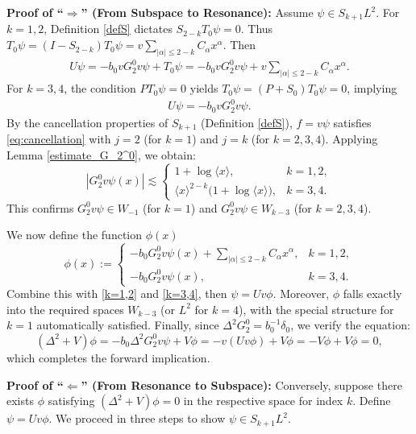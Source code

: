 \documentclass[reqno]{amsart}
\numberwithin{equation}{section}
\begin{document}
\textbf{Proof of ``$\bm{\Longrightarrow}$'' (From Subspace to Resonance):} 
Assume $\psi \in S_{{k}+1}L^2$. 
For ${k}=1,2$, Definition \ref{defS} dictates $S_{2-{k}}T_0\psi = 0$. Thus $T_0\psi = (I - S_{2-{k}})T_0\psi = v \sum_{|\alpha| \le 2-{k}} C_{\alpha} x^\alpha$. Then
\begin{align}\label{k=1,2}
	U\psi = -b_0 v G_2^0 v\psi + T_0\psi = -b_0 v G_2^0 v\psi + v\sum_{|\alpha| \le 2-{k}} C_{\alpha }x^\alpha.
\end{align}
For ${k}=3,4$, the condition $PT_0\psi = 0$ yields $T_0\psi =(P+S_0) T_0\psi=0$, implying
\begin{align}\label{k=3,4}
	U\psi = -b_0 v G_2^0 v\psi.
\end{align}
By the cancellation properties of $S_{{k}+1}$ (Definition \ref{defS}), $f = v\psi$ satisfies \eqref{eq:cancellation} with $j=2$ (for ${k}=1$) and $j={k}$ (for ${k}=2,3,4$). Applying Lemma \ref{estimate_G_2^0}, we obtain:
\begin{equation}\label{estimate_phi_G}
	\left| G_2^0 v\psi(x) \right| \lesssim
	\begin{cases}
		1 + \log \langle x \rangle, & {k} = 1,2, \\
		\langle x \rangle^{2 - {k}} \big( 1 + \log \langle x \rangle \big), & {k} = 3,4.
	\end{cases}
\end{equation}
This confirms $G_2^0 v\psi \in W_{-1}$ (for ${k}=1$) and $G_2^0 v\psi \in W_{{k}-3}$ (for ${k}=2,3,4$).

We now define the function $\phi(x)$ 
\begin{equation}\label{expression_psi}
	\phi(x) :=
	\begin{cases}
		-b_0 G_2^0 v\psi(x) + \sum_{|\alpha| \le 2 - {k}} C_\alpha x^\alpha, & {k} = 1,2, \\
		-b_0 G_2^0 v\psi(x), & {k} = 3,4.
	\end{cases}
\end{equation}
Combine this with  \eqref{k=1,2} and \eqref{k=3,4},  then $\psi = Uv\phi$. Moreover, $\phi$ falls exactly into the required spaces $W_{{k}-3}$ (or $L^2$ for ${k}=4$), with the special structure for ${k}=1$ automatically satisfied. Finally, since $\Delta^2 G_2^0 = b_0^{-1} \delta_0$, we verify the equation:
\[
(\Delta^2 + V)\phi = -b_0 \Delta^2 G_2^0 v\psi + V\phi = -v( Uv\phi) + V\phi = -V\phi + V\phi= 0,
\]
which completes the forward implication.


\vspace{0.2cm}
\textbf{Proof of ``$\bm{\Longleftarrow}$'' (From Resonance to Subspace):} 
Conversely, suppose there exists $\phi$ satisfying $(\Delta^2 + V)\phi = 0$ in the respective space for index ${k}$. Define $\psi = U v \phi$. We proceed in three steps to show $\psi \in S_{{k}+1}L^2$.
\end{document}
